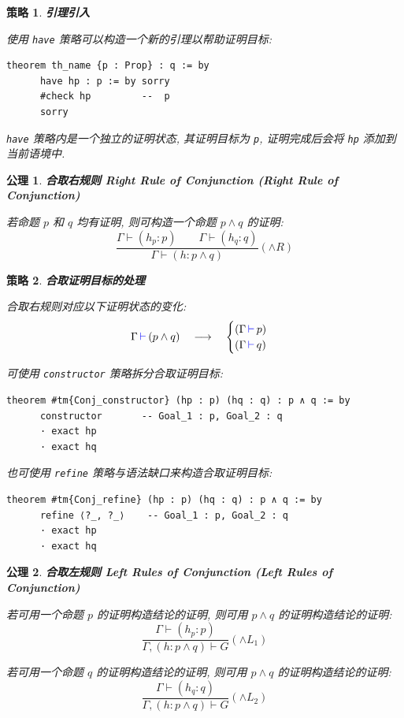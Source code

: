 \documentclass[UTF8]{ctexart}
\DeclareMathOperator{\0}{\mathbf{0}}                    %
\newcommand{\<}{\langle}
\renewcommand{\>}{\rangle}                              %
\newenvironment{thm_box}{
    \begin{tcolorbox}[enhanced, colback=thm_blue2, boxrule=0pt, frame hidden,
        borderline west={0.7mm}{0.1mm}{thm_blue1},breakable]
    }
    {\end{tcolorbox}}
\newenvironment{axm_box}{
    \begin{tcolorbox}[enhanced, colback=axm_yellow2, boxrule=0pt, frame hidden,
        borderline west={0.7mm}{0.1mm}{axm_yellow1},breakable]
    }
    {\end{tcolorbox}}
\theoremstyle{MyStyle} %
\newtheorem{axiom}{公理}[section]
\newenvironment{axm}[2]
{
    \begin{axm_box}
        \begin{axiom}
            \textbf{#1
                \ifx\relax#2\relax\else %
                    (#2) %
                \fi}
            \newline
}
{
        \end{axiom}
    \end{axm_box}
}
\newtheorem{mytactic}{策略}
\newenvironment{tactic}[1]
{
    \begin{thm_box}
        \begin{mytactic}
            \textbf{#1}
            \newline
}
{
        \end{mytactic}
    \end{thm_box}
}
\newcommand*{\lean}[1]{\texttt{\color{blue}#1}}
\newcommand{\Goal}{\texttt{\,\color{leanblue}\ensuremath{\vdash}\,}}
\begin{document}
        \begin{tactic}
            {引理引入}
            使用 \lean{have} 策略可以构造一个新的引理以帮助证明目标: 
            \begin{lstlisting}[style=lean]
    theorem th_name {p : Prop} : q := by
      have hp : p := by sorry
      #check hp         --  p
      sorry
            \end{lstlisting}

            \lean{have} 策略内是一个独立的证明状态, 其证明目标为 \texttt{p}, 证明完成后会将 \texttt{hp} 添加到当前语境中. 
        \end{tactic}
        
        \begin{axm}
            {合取右规则}
            {Right Rule of Conjunction}
            若命题 $p$ 和 $q$ 均有证明, 则可构造一个命题 $p\land q$ 的证明: 
            \[\frac{\Gamma\vdash(h_p : p)\qquad\Gamma\vdash(h_q : q)}{\Gamma\vdash(h : p\land q)}(\land R)\]
        \end{axm}

        \begin{tactic}
            {合取证明目标的处理}
            合取右规则对应以下证明状态的变化: 
            \[\Gamma\Goal(p\land q)\quad\longrightarrow\quad
            \begin{cases}
                (\Gamma\Goal p)\\
                (\Gamma\Goal q)
            \end{cases}\]
            
            可使用 \lean{constructor} 策略拆分合取证明目标: 
            \begin{lstlisting}[style=lean]
    theorem #tm{Conj_constructor} (hp : p) (hq : q) : p ∧ q := by
      constructor       -- Goal_1 : p, Goal_2 : q
      · exact hp
      · exact hq
            \end{lstlisting}
            
            也可使用 \lean{refine} 策略与语法缺口来构造合取证明目标: 
            \begin{lstlisting}[style=lean]
    theorem #tm{Conj_refine} (hp : p) (hq : q) : p ∧ q := by
      refine ⟨?_, ?_⟩    -- Goal_1 : p, Goal_2 : q
      · exact hp
      · exact hq
            \end{lstlisting}
        \end{tactic}

        \begin{axm}
            {合取左规则}
            {Left Rules of Conjunction}
            若可用一个命题 $p$ 的证明构造结论的证明, 则可用 $p\land q$ 的证明构造结论的证明: 
            \[\frac{\Gamma\vdash(h_p : p)}{\Gamma, (h : p\land q)\vdash G}(\land L_1)\]

            若可用一个命题 $q$ 的证明构造结论的证明, 则可用 $p\land q$ 的证明构造结论的证明:
            \[\frac{\Gamma\vdash(h_q : q)}{\Gamma, (h : p\land q)\vdash G}(\land L_2)\]
        \end{axm}
\end{document}
